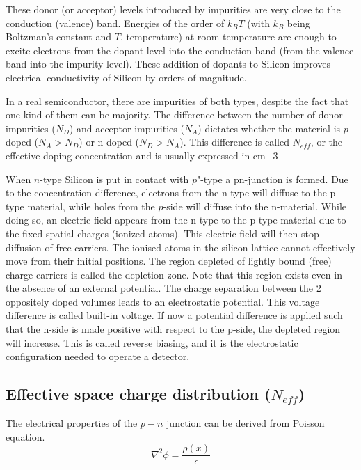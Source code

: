 These donor (or acceptor) levels introduced by impurities are very close to the
conduction (valence) band. Energies of the order of $k_B T$ (with $k_B$ being 
Boltzman's constant and $T$, temperature) at room temperature are enough to 
excite electrons from the dopant level into the conduction band (from the 
valence band into the impurity level). These addition of dopants to 
Silicon improves electrical conductivity of Silicon by orders of magnitude.  

In a real semiconductor, there are impurities of both types, despite the fact
that one kind of them can be majority. The difference between the number of
donor impurities ($N_D$) and acceptor impurities ($N_A$) dictates whether the
material is $p$-doped ($N_A > N_D $) or n-doped ($N_D > N_A$). This difference
is called $N_{eff}$, or the effective doping concentration and is usually 
expressed in cm$-3$

When $n$-type Silicon is put in contact with $p$"-type a pn-junction is formed.
Due to the concentration difference, electrons from the n-type will diffuse to
the p-type material, while holes from the $p$-side will diffuse into the
n-material. While doing so, an electric field appears from the n-type to the
p-type material due to the fixed spatial charges (ionized atoms). This electric
field will then stop diffusion of free carriers. The ionised atoms in the
silicon lattice cannot effectively move from their initial positions. The region
depleted of lightly bound (free) charge carriers is called the depletion zone.
Note that this region exists even in the absence of an external potential. The
charge separation between the 2 oppositely doped volumes leads to an electrostatic
potential. This voltage difference is called built-in
voltage. If now a potential difference is applied such that the n-side is made
positive with respect to the p-side, the depleted region will increase. This is
called reverse biasing, and it is the electrostatic configuration needed to 
operate a detector.

\subsection{Effective space charge distribution ($N_{eff}$)} 

The electrical properties of the $p-n$ junction can be derived from Poisson equation. 
\begin{equation}
\nabla^2 \phi = \frac{\rho(x)}{\epsilon} 
\label{eq:poisson}
\end{equation}

